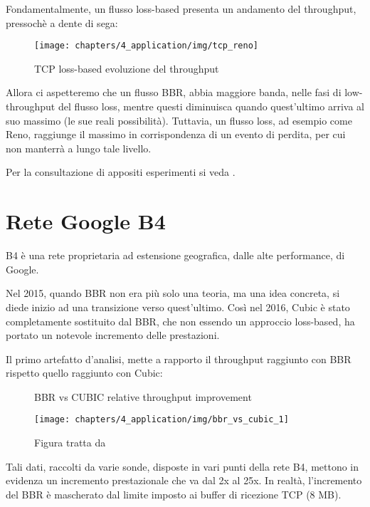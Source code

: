 Fondamentalmente, un flusso loss-based presenta un andamento del throughput, pressochè a dente di sega:

\begin{figure}[H]

\center
\caption{TCP loss-based evoluzione del throughput}
\texttt{[image: chapters/4\_application/img/tcp\_reno]}

\end{figure}

Allora ci aspetteremo che un flusso BBR, abbia maggiore banda, nelle fasi di low-throughput del flusso loss, mentre questi diminuisca quando quest'ultimo arriva al suo massimo (le sue reali possibilità). Tuttavia, un flusso loss, ad esempio come Reno, raggiunge il massimo in corrispondenza di un evento di perdita, per cui non manterrà a lungo tale livello. \bigskip

Per la consultazione di appositi esperimenti si veda \cite{ietf:ietf-98-bbr-slides}. 

\section{Rete Google B4}

B4 è una rete proprietaria ad estensione geografica, dalle alte performance, di Google. \bigskip

Nel 2015, quando BBR non era più solo una teoria, ma una idea concreta, si diede inizio ad una transizione verso quest'ultimo. Così nel 2016, Cubic è stato completamente sostituito dal BBR, che non essendo un approccio loss-based, ha portato un notevole incremento delle prestazioni. \bigskip

Il primo artefatto d'analisi, mette a rapporto il throughput raggiunto con BBR rispetto quello raggiunto con Cubic:

\begin{figure}[H]

\center
\caption{BBR vs CUBIC relative throughput improvement}
\texttt{[image: chapters/4\_application/img/bbr\_vs\_cubic\_1]}
\caption*{Figura tratta da \cite[p.~64]{Cardwell:2017:BCC:3042068.3009824}}

\end{figure}

Tali dati, raccolti da varie sonde, disposte in vari punti della rete B4, mettono in evidenza un incremento prestazionale che va dal 2x al 25x. In realtà, l'incremento del BBR è mascherato dal limite imposto ai buffer di ricezione TCP (8 MB). \bigskip

